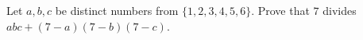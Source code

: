Let $a,b,c$ be distinct numbers from $\{1,2,3,4,5,6\}$. Prove that $7$ divides $abc+(7-a)(7-b)(7-c)$.
